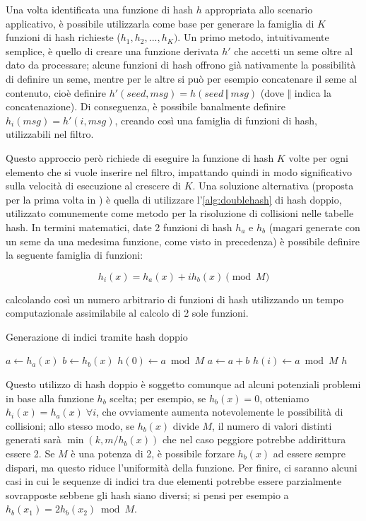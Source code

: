 Una volta identificata una funzione di hash $h$ appropriata allo scenario applicativo, è possibile
utilizzarla come base per generare la famiglia di $K$ funzioni di hash richieste ($h_1, h_2, ...,
h_K)$. Un primo metodo, intuitivamente semplice, è quello di creare una funzione derivata $h'$ che
accetti un seme oltre al dato da processare; alcune funzioni di hash offrono già nativamente la
possibilità di definire un seme, mentre per le altre si può per esempio concatenare il seme al
contenuto, cioè definire $h'(seed, msg) = h(seed\,\Vert\,msg)$ (dove $\Vert$ indica la
concatenazione). Di conseguenza, è possibile banalmente definire $h_i(msg) = h'(i, msg)$,
creando così una famiglia di funzioni di hash, utilizzabili nel filtro.

Questo approccio però richiede di eseguire la funzione di hash $K$ volte per ogni elemento che si
vuole inserire nel filtro, impattando quindi in modo significativo sulla velocità di esecuzione al
crescere di $K$. Una soluzione alternativa (proposta per la prima volta in \cite{bloom-doublehash}) è
quella di utilizzare l'\autoref{alg:doublehash} di hash doppio, utilizzato comunemente come
metodo per la risoluzione di collisioni nelle tabelle hash. In termini matematici, date 2 funzioni
di hash $h_a$ e $h_b$ (magari generate con un seme da una medesima funzione, come visto in
precedenza) è possibile definire la seguente famiglia di funzioni:

$$ h_i(x) = h_a(x) + ih_b(x) \pmod M $$ 

calcolando così un numero arbitrario di funzioni di hash utilizzando un tempo computazionale
assimilabile al calcolo di 2 sole funzioni.

\begin{algorithm}
\caption{Generazione di indici tramite hash doppio}
\label{alg:doublehash}
\begin{algorithmic}[1]
	\State $a \gets h_a(x)$
	\State $b \gets h_b(x)$
	\State $h(0) \gets a \bmod M$
		\State $a \gets a+b$
		\State $h(i) \gets a \bmod M$
	\EndFor
	\State \Return $h$
\EndProcedure
\end{algorithmic}
\end{algorithm}

Questo utilizzo di hash doppio è soggetto comunque ad alcuni potenziali problemi in base alla
funzione $h_b$ scelta; per esempio, se $h_b(x) = 0$, otteniamo $h_i(x) = h_a(x) \; \forall i$, che
ovviamente aumenta notevolemente le possibilità di collisioni; allo stesso modo, se $h_b(x)$ divide
$M$, il numero di valori distinti generati sarà $\min(k, m/h_b(x))$ che nel caso peggiore potrebbe
addirittura essere \num{2}. Se $M$ è una potenza di \num{2}, è possibile forzare $h_b(x)$ ad essere
sempre dispari, ma questo riduce l'uniformità della funzione. Per finire, ci saranno alcuni casi in
cui le sequenze di indici tra due elementi potrebbe essere parzialmente sovrapposte sebbene gli hash
siano diversi; si pensi per esempio a $h_b(x_1) = 2h_b(x_2) \bmod M$.

